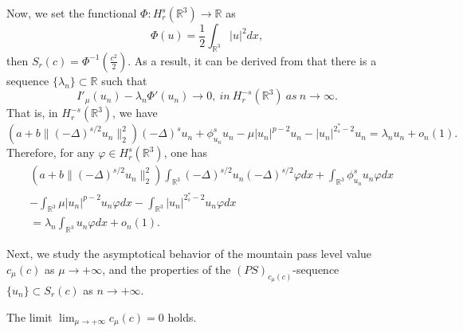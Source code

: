 \documentclass[reqno]{amsart}
\begin{document}
Now, we set the functional $\Phi:H^s_r(\mathbb{R}^3)\to \mathbb{R}$ as
$$
\Phi(u)=\frac{1}{2}\int_{\mathbb{R}^3} |u|^2dx,
$$
then $S_{r}(c)=\Phi^{-1}(\frac{c^2}{2})$. As a result, it can be derived from 
\cite[Proposition 5.12]{W6888} that there is a sequence 
$\{\lambda_n\}\subset \mathbb{R}$ such that
$$
I'_\mu(u_n)-\lambda_n \Phi'(u_n)\to 0,~in ~H^{-s}_r(\mathbb{R}^3) ~as~n\to \infty.
$$
That is, in $H^{-s}_r(\mathbb{R}^3)$, we have
\begin{equation}\label{5.16}
\left(a+b\|(-\Delta)^{s/2}u_n\|^2_2\right)(-\Delta)^s u_n+\phi^s_{u_n}u_n
-\mu |u_n|^{p-2}u_n-|u_n|^{2^*_s-2}u_n
=\lambda_n u_n+o_n(1).
\end{equation}
Therefore, for any $\varphi \in H^s_r(\mathbb{R}^3)$, one has
\begin{equation}\label{5.166}
\begin{split}
&\left(a+b\|(-\Delta)^{s/2}u_n\|^2_2\right)
\int_{\mathbb{R}^3}(-\Delta)^{s/2} u_n(-\Delta)^{s/2} \varphi dx
+\int_{\mathbb{R}^3}\phi^s_{u_n}u_n\varphi dx \\
&-\int_{\mathbb{R}^3}\mu |u_n|^{p-2}u_n\varphi dx
 -\int_{\mathbb{R}^3}|u_n|^{2^*_s-2}u_n\varphi dx \\
&=\lambda_n \int_{\mathbb{R}^3}u_n\varphi dx +o_n(1).
\end{split}
\end{equation}

Next, we study the asymptotical behavior of the mountain pass level value 
$c_\mu(c)$ as $\mu \to +\infty$, and the properties of  the $(PS)_{c_\mu(c)}$-sequence 
$\{u_n\}\subset S_{r}(c)$ as $n\to +\infty$.

\begin{lemma}\label{lem5.7} 
The limit $\lim_{\mu\to +\infty}c_\mu(c)=0 $ holds.
\end{lemma}
\end{document}
